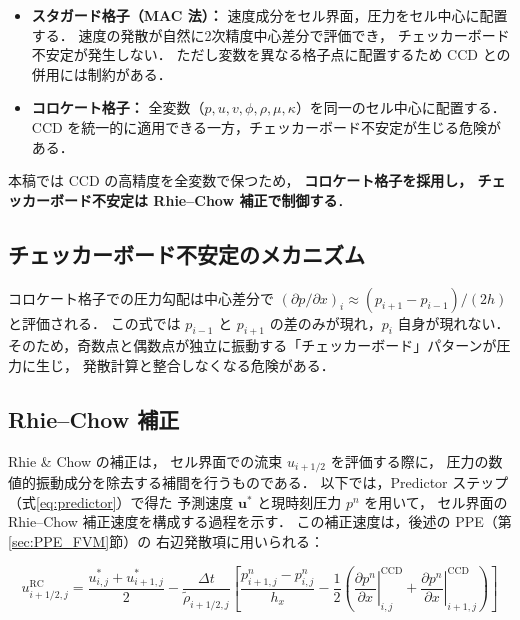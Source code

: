 \documentclass[12pt, a4paper, titlepage]{article}
\newcommand{\jp}[1]{{\normalfont\jpfont #1}}
\newcommand{\bu}{\bm{u}}
\begin{document}
\begin{itemize}
  \item \jp{\textbf{スタガード格子（MAC 法）：}
        速度成分をセル界面，圧力をセル中心に配置する．
        速度の発散が自然に2次精度中心差分で評価でき，
        チェッカーボード不安定が発生しない．
        ただし変数を異なる格子点に配置するため CCD との併用には制約がある．}

  \item \jp{\textbf{コロケート格子：}
        全変数（$p, u, v, \phi, \rho, \mu, \kappa$）を同一のセル中心に配置する．
        CCD を統一的に適用できる一方，チェッカーボード不安定が生じる危険がある．}
\end{itemize}

\jp{本稿では CCD の高精度を全変数で保つため，
\textbf{コロケート格子を採用し，
チェッカーボード不安定は Rhie--Chow 補正で制御する}．}

\subsection{\jp{チェッカーボード不安定のメカニズム}}

\jp{コロケート格子での圧力勾配は中心差分で
$(\partial p/\partial x)_i \approx (p_{i+1}-p_{i-1})/(2h)$ と評価される．
この式では $p_{i-1}$ と $p_{i+1}$ の差のみが現れ，$p_i$ 自身が現れない．
そのため，奇数点と偶数点が独立に振動する「チェッカーボード」パターンが圧力に生じ，
発散計算と整合しなくなる危険がある．}

\subsection{Rhie--Chow \jp{補正}}

\jp{Rhie \& Chow \cite{RhieChow1983} の補正は，
セル界面での流束 $u_{i+1/2}$ を評価する際に，
圧力の数値的振動成分を除去する補間を行うものである．
以下では，Predictor ステップ（式\eqref{eq:predictor}）で得た
予測速度 $\bu^*$ と現時刻圧力 $p^n$ を用いて，
セル界面の Rhie--Chow 補正速度を構成する過程を示す．
この補正速度は，後述の PPE（第\ref{sec:PPE_FVM}節）の
右辺発散項に用いられる：}
\begin{tcolorbox}[mybox, title={Rhie--Chow \jp{補正速度（セル界面，2次元）}}]
\begin{equation}
  u_{i+1/2,j}^{\mathrm{RC}}
  = \frac{u^*_{i,j} + u^*_{i+1,j}}{2}
  - \frac{\Delta t}{\tilde\rho_{i+1/2,j}}
    \!\left[
      \frac{p^n_{i+1,j} - p^n_{i,j}}{h_x}
      - \frac{1}{2}\!\left(
        \left.\frac{\partial p^n}{\partial x}\right|_{i,j}^{\mathrm{CCD}}
        + \left.\frac{\partial p^n}{\partial x}\right|_{i+1,j}^{\mathrm{CCD}}
      \right)
    \right]
  \label{eq:rhie_chow}
\end{equation}
\end{tcolorbox}
\end{document}

